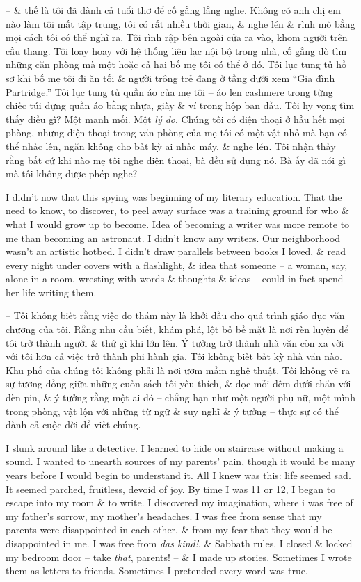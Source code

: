 \documentclass{article}
\begin{document}
\begin{itemize}
	-- \& thế là tôi đã dành cả tuổi thơ để cố gắng lắng nghe. Không có anh chị em nào làm tôi mất tập trung, tôi có rất nhiều thời gian, \& nghe lén \& rình mò bằng mọi cách tôi có thể nghĩ ra. Tôi rình rập bên ngoài cửa ra vào, khom người trên cầu thang. Tôi loay hoay với hệ thống liên lạc nội bộ trong nhà, cố gắng dò tìm những căn phòng mà một hoặc cả hai bố mẹ tôi có thể ở đó. Tôi lục tung tủ hồ sơ khi bố mẹ tôi đi ăn tối \& người trông trẻ đang ở tầng dưới xem ``Gia đình Partridge.'' Tôi lục tung tủ quần áo của mẹ tôi -- áo len cashmere trong từng chiếc túi đựng quần áo bằng nhựa, giày \& ví trong hộp ban đầu. Tôi hy vọng tìm thấy điều gì? Một manh mối. Một {\it lý do}. Chúng tôi có điện thoại ở hầu hết mọi phòng, nhưng điện thoại trong văn phòng của mẹ tôi có một vật nhỏ mà bạn có thể nhấc lên, ngăn không cho bất kỳ ai nhấc máy, \& nghe lén. Tôi nhận thấy rằng bất cứ khi nào mẹ tôi nghe điện thoại, bà đều sử dụng nó. Bà ấy đã nói gì mà tôi không được phép nghe?
	
	I didn't now that this spying was beginning of my literary education. That the need to know, to discover, to peel away surface was a training ground for who \& what I would grow up to become. Idea of becoming a writer was more remote to me than becoming an astronaut. I didn't know any writers. Our neighborhood wasn't an artistic hotbed. I didn't draw parallels between books I loved, \& read every night under covers with a flashlight, \& idea that someone -- a woman, say, alone in a room, wresting with words \& thoughts \& ideas -- could in fact spend her life writing them.
	
	-- Tôi không biết rằng việc do thám này là khởi đầu cho quá trình giáo dục văn chương của tôi. Rằng nhu cầu biết, khám phá, lột bỏ bề mặt là nơi rèn luyện để tôi trở thành người \& thứ gì khi lớn lên. Ý tưởng trở thành nhà văn còn xa vời với tôi hơn cả việc trở thành phi hành gia. Tôi không biết bất kỳ nhà văn nào. Khu phố của chúng tôi không phải là nơi ươm mầm nghệ thuật. Tôi không vẽ ra sự tương đồng giữa những cuốn sách tôi yêu thích, \& đọc mỗi đêm dưới chăn với đèn pin, \& ý tưởng rằng một ai đó -- chẳng hạn như một người phụ nữ, một mình trong phòng, vật lộn với những từ ngữ \& suy nghĩ \& ý tưởng -- thực sự có thể dành cả cuộc đời để viết chúng.
	
	I slunk around like a detective. I learned to hide on staircase without making a sound. I wanted to unearth sources of my parents' pain, though it would be many years before I would begin to understand it. All I knew was this: life seemed sad. It seemed parched, fruitless, devoid of joy. By time I was 11 or 12, I began to escape into my room \& to write. I discovered my imagination, where i was free of my father's sorrow, my mother's headaches. I was free from sense that my parents were disappointed in each other, \& from my fear that they would be disappointed in me. I was free from {\it das kind!}, \& Sabbath rules. I closed \& locked my bedroom door -- take {\it that}, parents! -- \& I made up stories. Sometimes I wrote them as letters to friends. Sometimes I pretended every word was true.
	

\end{itemize}
\end{document}

